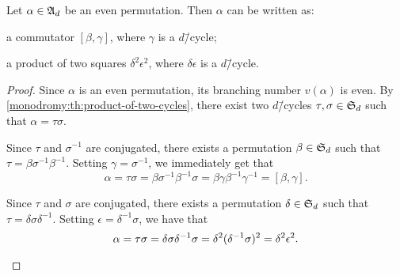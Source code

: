 \begin{corollary}\label{monodromy:th:even-permutation-commutator-or-squares}
Let $\alpha\in\altgroup[d]$ be an even permutation. Then $\alpha$ can be written as:
\begin{enumroman}
\item a commutator $[\beta,\gamma]$, where $\gamma$ is a $d$\=/cycle;
\item a product of two squares $\delta^2\epsilon^2$, where $\delta\epsilon$ is a $d$\=/cycle.
\end{enumroman}
\end{corollary}
\begin{proof}
Since $\alpha$ is an even permutation, its branching number $v(\alpha)$ is even. By \cref{monodromy:th:product-of-two-cycles}, there exist two $d$\=/cycles $\tau,\sigma\in\symgroup[d]$ such that $\alpha=\tau\sigma$.
\begin{enumroman}
\item Since $\tau$ and $\sigma^{-1}$ are conjugated, there exists a permutation $\beta\in\symgroup[d]$ such that $\tau=\beta\sigma^{-1}\beta^{-1}$. Setting $\gamma=\sigma^{-1}$, we immediately get that
\[
\alpha=\tau\sigma=\beta\sigma^{-1}\beta^{-1}\sigma=\beta\gamma\beta^{-1}\gamma^{-1}=[\beta,\gamma].
\]
\item Since $\tau$ and $\sigma$ are conjugated, there exists a permutation $\delta\in\symgroup[d]$ such that $\tau=\delta\sigma\delta^{-1}$. Setting $\epsilon=\delta^{-1}\sigma$, we have that
\[
\alpha=\tau\sigma=\delta\sigma\delta^{-1}\sigma=\delta^2(\delta^{-1}\sigma)^2=\delta^2\epsilon^2.\qedhere
\]
\end{enumroman}
\end{proof}

